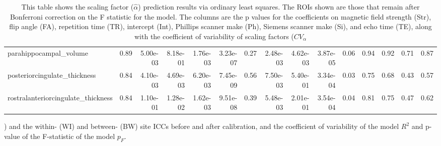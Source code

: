 \begin{table}
\begin{tabular}{lrrrrrrrrrrrrrr}
parahippocampal\_volume             &  0.89 &    5.00e-03 &     8.18e-01 &  1.76e-03 &     3.23e-07 &          0.27 &      2.48e-03 &  4.62e-03 &  3.87e-05 &  0.06 &  0.94 &    0.92 &  0.71 &    0.87 \\
posteriorcingulate\_thickness       &  0.84 &    4.10e-03 &     4.69e-03 &  6.20e-03 &     7.45e-09 &          0.56 &      7.50e-03 &  5.40e-01 &  3.34e-04 &  0.03 &  0.75 &    0.68 &  0.43 &    0.57 \\
rostralanteriorcingulate\_thickness &  0.84 &    1.10e-01 &     1.28e-02 &  1.62e-03 &     9.51e-08 &          0.39 &      5.48e-03 &  2.01e-01 &  3.54e-04 &  0.04 &  0.81 &    0.75 &  0.47 &    0.62 \\
\bottomrule
\end{tabular}
\label{tab:alpha_predict}
\leftalign
\caption{This table shows the scaling factor ($\hat{\alpha}$)  prediction results via ordinary least squares. The ROIs shown are those that remain after Bonferroni correction on the F statistic for the model. The columns are the p values for the coefficients on magnetic field strength (Str), flip angle (FA), repetition time (TR), intercept (Int), Phillips scanner make (Ph), Siemens scanner make (Si), and echo time (TE), along with the coefficient of variability of scaling factors ($CV_\alpha$}) and the within- (WI) and between- (BW) site ICCs before and after calibration, and the coefficient of variability of the model $R^2$ and p-value of the F-statistic of the model $p_F$.
\end{table}
